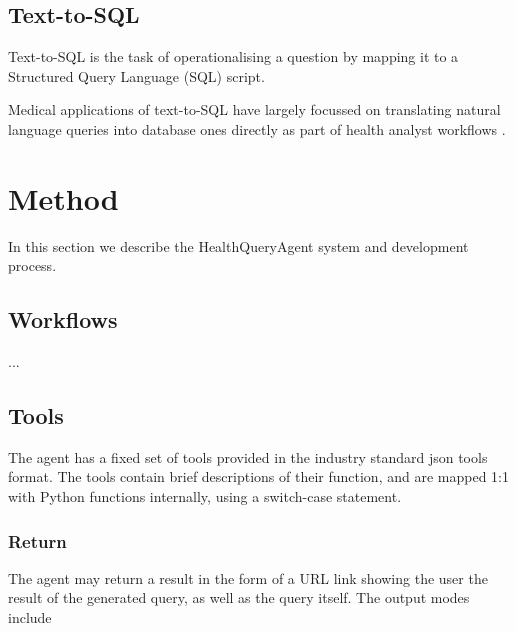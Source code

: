 \documentclass[11pt]{article}
\begin{document}
\subsection{Text-to-SQL}
Text-to-SQL is the task of operationalising a question by mapping it to a Structured Query Language (SQL) script.

Medical applications of text-to-SQL have largely focussed on translating natural language queries into database ones directly as part of health analyst workflows \citet{ziletti_retrieval_2024}.

\section{Method}
In this section we describe the HealthQueryAgent system and development process.


\subsection{Workflows}
...

\subsection{Tools}
The agent has a fixed set of tools provided in the industry standard json tools format.
The tools contain brief descriptions of their function, and are mapped 1:1 with Python functions internally, using a switch-case statement.

\subsubsection{Return}
The agent may return a result in the form of a URL link showing the user the result of the generated query, as well as the query itself.
The output modes include
\end{document}
